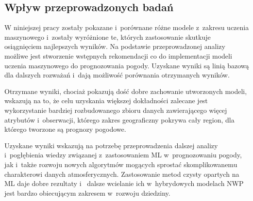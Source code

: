 \subsection{Wpływ przeprowadzonych badań}

W niniejszej pracy zostały pokazane i~porównane różne modele z~zakresu uczenia
maszynowego i~zostały wyróżnione te, których zastosowanie skutkuje 
osiągnięciem najlepszych wyników. Na podstawie przeprowadzonej analizy 
możliwe jest stworzenie wstępnych rekomendacji co do implementacji
modeli uczenia maszynowego do prognozowania pogody. Uzyskane wyniki są linią bazową
dla dalszych rozważań i~dają możliwość porównania otrzymanych wyników.

Otrzymane wyniki, chociaż pokazują dość dobre zachowanie utworzonych modeli, wskazują na to,
że celu uzyskania większej dokładności zalecane jest wykorzystanie bardziej 
rozbudowanego zbioru danych zawierającego więcej atrybutów i~obserwacji, którego
zakres geograficzny pokrywa cały region, dla którego tworzone są prognozy pogodowe.

Uzyskane wyniki wskazują na potrzebę przeprowadzenia dalszej analizy i~pogłębienia
wiedzy związanej z~zastosowaniem ML w~prognozowaniu pogody, jak i~także 
rozwoju nowych algorytmów mogących sprostać skomplikowanemu charakterowi danych 
atmosferycznych. Zastosowanie metod czysty opartych na ML daje dobre rezultaty i~
dalsze wcielanie ich w~hybrydowych modelach NWP jest bardzo obiecującym 
zakresem w~rozwoju dziedziny.

